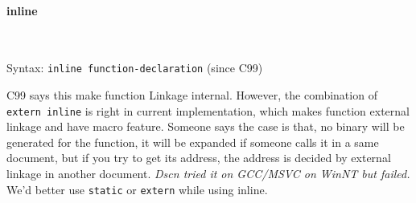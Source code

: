 

\paragraph{inline} \

Syntax: \verb|inline function-declaration| (since C99)

C99\cite{StdC99} says this make function Linkage internal. However, the combination of \verb|extern inline| is right in current implementation, which makes function external linkage and have macro feature. Someone says the case is that, no binary will be generated for the function, it will be expanded if someone calls it in a same document, but if you try to get its address, the address is decided by external linkage in another document. \textit{Dscn tried it on GCC/MSVC on WinNT but failed.} We'd better use \verb|static| or \verb|extern| while using inline.

